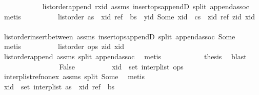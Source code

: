 \begin{isabellebody}
\ \ \ \ \ \ \ \ \ \ \isamarkupfalse%
\ list{\isacharunderscore}order{\isacharunderscore}append\ r{\isacharunderscore}xid\ assms{\isacharparenleft}{}{\isacharparenright}\ insert{\isacharunderscore}ops{\isacharunderscore}appendD\ split\ append{\isachardot}assoc\ \isamarkupfalse%
\ metis\isanewline
\ \ \ \ \ \ \ \ \isamarkupfalse%
\ {\isachardoublequoteopen}list{\isacharunderscore}order\ {\isacharparenleft}as\ {\isacharat}\ {\isacharbrackleft}{\isacharparenleft}xid{\isacharcomma}\ ref{\isacharparenright}{\isacharbrackright}\ {\isacharat}\ bs\ {\isacharat}\ {\isacharbrackleft}{\isacharparenleft}yid{\isacharcomma}\ Some\ xid{\isacharparenright}{\isacharbrackright}\ {\isacharat}\ cs\ {\isacharat}\ {\isacharbrackleft}{\isacharparenleft}zid{\isacharcomma}\ ref{\isacharparenright}{\isacharbrackright}{\isacharparenright}\ zid\ xid{\isachardoublequoteclose}\isanewline
\ \ \ \ \ \ \ \ \ \ \isamarkupfalse%
\ list{\isacharunderscore}order{\isacharunderscore}insert{\isacharunderscore}between\ assms{\isacharparenleft}{}{\isacharparenright}\ insert{\isacharunderscore}ops{\isacharunderscore}appendD\ split\ append{\isachardot}assoc\ Some\ \isamarkupfalse%
\ metis\isanewline
\ \ \ \ \ \ \ \ \isamarkupfalse%
\ {\isachardoublequoteopen}list{\isacharunderscore}order\ ops\ zid\ xid{\isachardoublequoteclose}\isanewline
\ \ \ \ \ \ \ \ \ \ \isamarkupfalse%
\ list{\isacharunderscore}order{\isacharunderscore}append\ assms{\isacharparenleft}{}{\isacharparenright}\ split\ append{\isachardot}assoc\ \isamarkupfalse%
\ metis\isanewline
\ \ \ \ \ \ \ \ \isamarkupfalse%
\ \isamarkupfalse%
\ {\isacharquery}thesis\ \isamarkupfalse%
\ blast\isanewline
\ \ \ \ \ \ \isamarkupfalse%
\isanewline
\ \ \ \ \ \ \ \ \isamarkupfalse%
\ False\isanewline
\ \ \ \ \ \ \ \ \isamarkupfalse%
\ {\isachardoublequoteopen}xid\ {\isasymnotin}\ set\ {\isacharparenleft}interp{\isacharunderscore}list\ ops{\isacharparenright}{\isachardoublequoteclose}\isanewline
\ \ \ \ \ \ \ \ \ \ \isamarkupfalse%
\ interp{\isacharunderscore}list{\isacharunderscore}ref{\isacharunderscore}nonex\ assms{\isacharparenleft}{}{\isacharparenright}\ split\ Some\ \isamarkupfalse%
\ metis\isanewline
\ \ \ \ \ \ \ \ \isamarkupfalse%
\ \isamarkupfalse%
\ {\isachardoublequoteopen}xid\ {\isasymnotin}\ set\ {\isacharparenleft}interp{\isacharunderscore}list\ {\isacharparenleft}as\ {\isacharat}\ {\isacharbrackleft}{\isacharparenleft}xid{\isacharcomma}\ ref{\isacharparenright}{\isacharbrackright}\ {\isacharat}\ bs{\isacharparenright}{\isacharparenright}{\isachardoublequoteclose}\isanewline

\end{isabellebody}
